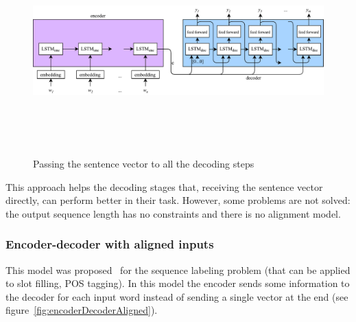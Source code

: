 
\begin{figure}[!htbp]
    \centering
    \includegraphics[max width=\linewidth,max height=8cm,keepaspectratio]{figures/encoderDecoderKeepC}
    \caption{Passing the sentence vector to all the decoding steps}\label{fig:encoderDecoderKeepC}
\end{figure}

This approach helps the decoding stages that, receiving the sentence vector directly, can perform better in their task. However, some problems are not solved: the output sequence length has no constraints and there is no alignment model.

\subsubsection{Encoder-decoder with aligned inputs}
This model was proposed~\cite{liu2016attention} for the sequence labeling problem (that can be applied to slot filling, POS tagging). In this model the encoder sends some information to the decoder for each input word instead of sending a single vector at the end (see figure~\ref{fig:encoderDecoderAligned}).


